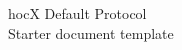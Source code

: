 \begin{center}
  {\LARGE hocX Default Protocol}\\[1em]
  {\large Starter document template}
\end{center}

